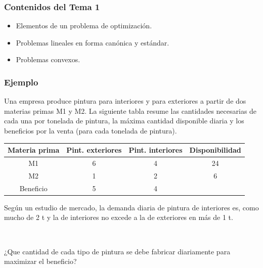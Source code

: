\documentclass{beamer}
\begin{document}
\begin{frame}[plain]
\frametitle{Contenidos del Tema 1}

\begin{itemize}
 

  \item Elementos de un problema de optimización.
  \item Problemas lineales en forma canónica y estándar.
  \item Problemas convexos.
 
\end{itemize}


\end{frame}
\begin{frame}
\frametitle{Ejemplo}

Una empresa produce pintura para interiores y para exteriores a partir de dos materias primas M1 y M2. La siguiente tabla resume las cantidades necesarias de cada una por tonelada de pintura,  la máxima cantidad disponible diaria y los beneficios por la venta (para cada tonelada de pintura).

{\scriptsize
\begin{center}
\begin{tabular}{cccc}
Materia prima & Pint. exteriores & Pint. interiores & Disponibilidad \\ \hline
M1 & 6 & 4 & 24 \\
M2 & 1 & 2 & 6  \\ \hline
Beneficio & 5 & 4 \\  \hline
\end{tabular}
\end{center}
}

Según un estudio de mercado, la demanda diaria de pintura de interiores es, como mucho de 2 t y la de interiores no excede a la de exteriores en más de 1 t.
 
 
 \

¿Que cantidad de cada tipo de pintura se debe fabricar diariamente para maximizar el beneficio?

\end{frame}
\end{document}
